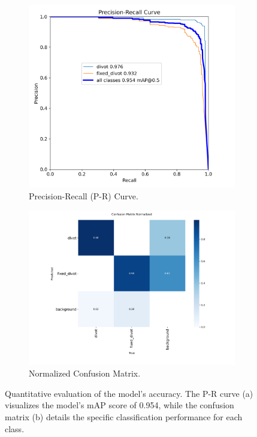 \begin{figure}[h!]
    \centering
    \begin{subfigure}[b]{0.49\textwidth}
        \centering
        \includegraphics[width=\textwidth]{figures/precision_recall_curve.png}
        \caption{Precision-Recall (P-R) Curve.}
        \label{fig:pr_curve_sub}
    \end{subfigure}
    \hfill 
    \begin{subfigure}[b]{0.49\textwidth}
        \centering
        \includegraphics[width=\textwidth]{figures/confusion_matrix_normalized.png}
        \caption{Normalized Confusion Matrix.}
        \label{fig:cm_sub}
    \end{subfigure}
    
    \caption[Key Performance Metrics: P-R Curve and Confusion Matrix.] 
    {Quantitative evaluation of the model's accuracy. The P-R curve (a) visualizes the model's mAP score of 0.954, while the confusion matrix (b) details the specific classification performance for each class.}
    \label{fig:accuracy_metrics}
\end{figure}

